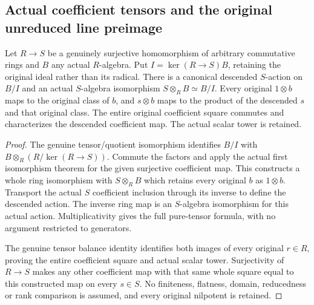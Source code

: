 \subsection{Actual coefficient tensors and the original unreduced line preimage}
\label{subsec:surjective-line-tensor-pullbacks}

\begin{theorem}
\label{algebra:surjective-base-change-original-quotient}
\leanok
Let $R\to S$ be a genuinely surjective homomorphism of arbitrary
commutative rings and $B$ any actual $R$-algebra. Put
$I=\ker(R\to S)B$, retaining the original ideal rather than its radical.
There is a canonical descended $S$-action on $B/I$ and an actual
$S$-algebra isomorphism $S\otimes_R B\simeq B/I$. Every original
$1\otimes b$ maps to the original class of $b$, and $s\otimes b$
maps to the product of the descended $s$ and that original class.
The entire original coefficient square commutes and characterizes
the descended coefficient map. The actual scalar tower is retained.
\end{theorem}
\begin{proof}
The genuine tensor/quotient isomorphism identifies $B/I$ with
$B\otimes_R(R/\ker(R\to S))$. Commute the factors and apply the
actual first isomorphism theorem for the given surjective coefficient
map. This constructs a whole ring isomorphism with $S\otimes_R B$
which retains every original $b$ as $1\otimes b$. Transport the
actual $S$ coefficient inclusion through its inverse to define the
descended action. The inverse ring map is an $S$-algebra isomorphism
for this actual action. Multiplicativity gives the full pure-tensor
formula, with no argument restricted to generators.

The genuine tensor balance identity identifies both images of every
original $r\in R$, proving the entire coefficient square and actual
scalar tower. Surjectivity of $R\to S$ makes any other coefficient
map with that same whole square equal to this constructed map on
every $s\in S$. No finiteness, flatness, domain, reducedness or rank
comparison is assumed, and every original nilpotent is retained.
\end{proof}

